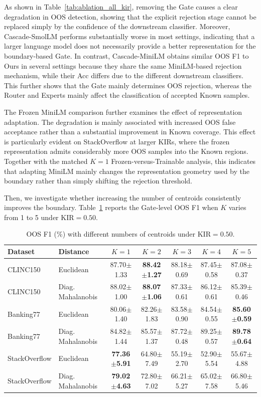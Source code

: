 \documentclass[11pt]{article}
\begin{document}
As shown in Table~\ref{tab:ablation_all_kir}, removing the Gate causes a clear degradation in OOS detection, showing that the explicit rejection stage cannot be replaced simply by the confidence of the downstream classifier. Moreover, Cascade-SmolLM performs substantially worse in most settings, indicating that a larger language model does not necessarily provide a better representation for the boundary-based Gate. In contrast, Cascade-MiniLM obtains similar OOS F1 to Ours in several settings because they share the same MiniLM-based rejection mechanism, while their Acc differs due to the different downstream classifiers. This further shows that the Gate mainly determines OOS rejection, whereas the Router and Experts mainly affect the classification of accepted Known samples.

The Frozen MiniLM comparison further examines the effect of representation adaptation. The degradation is mainly associated with increased OOS false acceptance rather than a substantial improvement in Known coverage. This effect is particularly evident on StackOverflow at larger KIRs, where the frozen representation admits considerably more OOS samples into the Known regions. Together with the matched $K=1$ Frozen-versus-Trainable analysis, this indicates that adapting MiniLM mainly changes the representation geometry used by the boundary rather than simply shifting the rejection threshold.

Then, we investigate whether increasing the number of centroids consistently improves the boundary. Table~\ref{tab:k_ablation} reports the Gate-level OOS F1 when $K$ varies from 1 to 5 under KIR$=0.50$.

\begin{table}[t]
\centering
\small
\setlength{\tabcolsep}{4.0pt}
\renewcommand{\arraystretch}{1.05}
\begin{tabular}{llccccc}
\toprule
\textbf{Dataset} & \textbf{Distance} & $K=1$ & $K=2$ & $K=3$ & $K=4$ & $K=5$\\
\midrule
CLINC150 & Euclidean & 87.70$\pm$1.33 & \textbf{88.42$\pm$1.27} & 88.18$\pm$0.69 & 87.45$\pm$0.58 & 87.08$\pm$0.37\\
CLINC150 & Diag. Mahalanobis & 88.02$\pm$1.00 & \textbf{88.07$\pm$1.06} & 87.33$\pm$0.61 & 86.12$\pm$0.61 & 85.39$\pm$0.46\\
Banking77 & Euclidean & 80.06$\pm$1.40 & 82.26$\pm$1.83 & 83.58$\pm$0.90 & 84.54$\pm$0.55 & \textbf{85.60$\pm$0.59}\\
Banking77 & Diag. Mahalanobis & 84.82$\pm$1.44 & 85.57$\pm$1.37 & 87.72$\pm$0.48 & 89.25$\pm$0.57 & \textbf{89.78$\pm$0.64}\\
StackOverflow & Euclidean & \textbf{77.36$\pm$5.91} & 64.80$\pm$7.49 & 55.19$\pm$2.70 & 52.90$\pm$5.54 & 55.67$\pm$4.88\\
StackOverflow & Diag. Mahalanobis & \textbf{79.02$\pm$4.63} & 72.80$\pm$7.02 & 66.21$\pm$5.27 & 65.02$\pm$7.58 & 66.80$\pm$5.46\\
\bottomrule
\end{tabular}
\caption{OOS F1 (\%) with different numbers of centroids under KIR$=0.50$.}
\label{tab:k_ablation}
\end{table}
\end{document}
